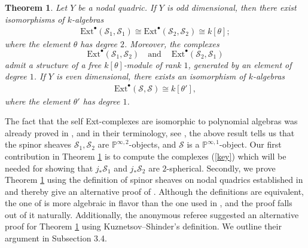 \documentclass[a4paper, twoside, 11pt]{amsart}
\newtheorem{theorem}{Theorem}[section]
\theoremstyle{definition}
\theoremstyle{remark}
\numberwithin{equation}{theorem}
\begin{document}
\begin{theorem}\label{heart_intro}
Let $Y$ be a nodal quadric. If $Y$ is odd dimensional, then there exist isomorphisms of $k$-algebras
        \begin{equation}\label{redo_odd}
            \begin{aligned}
                \mathrm{Ext}^{\bullet}(\mathcal{S}_1,\mathcal{S}_1) \cong \mathrm{Ext}^{\bullet}(\mathcal{S}_2,\mathcal{S}_2)  \cong k[\theta];
                \end{aligned}
        \end{equation}
    where the element $\theta$ has degree $2$. Moreover, the complexes 
        \begin{equation}\label{key}
            \mathrm{Ext}^{\bullet}(\mathcal{S}_1,\mathcal{S}_2) \quad \text{and} \quad \ \mathrm{Ext}^{\bullet}(\mathcal{S}_2,\mathcal{S}_1)
        \end{equation}
    admit a structure of a free $k[\theta]$-module of rank $1$, generated by an element of degree $1$. If $Y$ is even dimensional, there exists an isomorphism of $k$-algebras
        \begin{equation}\label{redo_even}
            \begin{aligned}
                \mathrm{Ext}^{\bullet}(\mathcal{S},\mathcal{S}) \cong k[\theta'],
            \end{aligned}
        \end{equation}
    where the element $\theta'$ has degree $1$.
\end{theorem}
The fact that the self Ext-complexes are isomorphic to polynomial algebras was already proved in \cite[Proposition 6.4]{categorical_absorptions}, and in their terminology, see \cite[Definition 1.7]{categorical_absorptions}, the above result tells us that the spinor sheaves $\mathcal{S}_1, \mathcal{S}_2$ are $\mathbb{P}^{\infty,2}$-objects, and $\mathcal{S}$ is a $\mathbb{P}^{\infty,1}$-object. Our first contribution in Theorem \ref{heart_intro} is to compute the complexes (\ref{key}) which will be needed for showing that $j_*\mathcal{S}_1$ and  $j_*\mathcal{S}_2$ are $2$-spherical. Secondly, we prove Theorem \ref{heart_intro} using the definition of spinor sheaves on nodal quadrics established in \cite{Addington} and thereby give an alternative proof of \cite[Proposition 6.4]{categorical_absorptions}. Although the definitions are equivalent, the one of \cite{Addington} is more algebraic in flavor than the one used in \cite{categorical_absorptions}, and the proof falls out of it naturally. Additionally, the anonymous referee suggested an alternative proof for Theorem \ref{heart_intro} using Kuznetsov--Shinder’s definition. We outline their argument in Subsection 3.4. 
\end{document}

